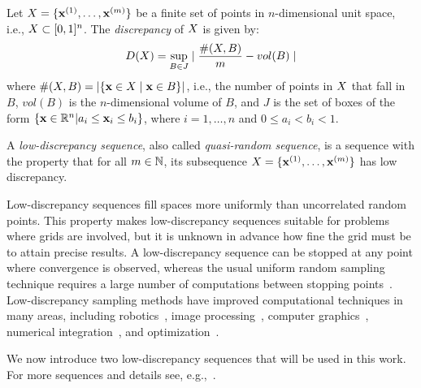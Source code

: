 \begin{definition}
	Let $X = \{  \mathbf{x}^{(1)}, \dots, \mathbf{x}^{(m)} \}$ be a finite set of points in
	$n$-dimensional unit space, i.e., $X \subset [0,1]^n$. The \emph{discrepancy}
	of $X$ is given by:
	\begin{equation}
		D(X) = \sup_{B \in J} \mid \frac{\#(X,B)}{m} - vol(B) \mid
	\end{equation}
	where $\#(X,B) = |\{ \mathbf{x} \in X \mid \mathbf{x} \in B \}|$, i.e., the number of
	points in $X$ that fall in $B$, $vol(B)$ is the $n$-dimensional volume of $B$,
	and $J$ is the set of boxes of the form $\{ \mathbf{x} \in \mathbb{R}^n | a_i \leq \mathbf{x}_i \leq b_i \}$,
	where $i=1,\dots,n$ and $0 \leq a_i < b_i < 1$.
\end{definition}

\begin{definition}
	A \emph{low-discrepancy sequence}, also called 
	\emph{quasi-random sequence}, is a sequence with the 
	property that for all $m \in \mathbb{N}$,
	its subsequence $X = \{ \mathbf{x}^{(1)}, \dots, \mathbf{x}^{(m)} \}$ has low discrepancy.
\end{definition}

Low-discrepancy sequences fill spaces more uniformly than uncorrelated
random points.
This property makes low-discrepancy sequences suitable for problems where grids are involved, but it is unknown in advance how fine the grid must be to attain precise results.
A low-discrepancy sequence can be stopped 
at any point where convergence is observed, whereas the usual uniform random sampling technique requires a large number of computations between stopping points~\cite{trandafir_quasirandom}. 
Low-discrepancy sampling methods have
improved computational techniques in many areas, including
robotics~\cite{branicky2001quasi}, image processing~\cite{hannaford1993resolution}, computer graphics~\cite{shirley1991discrepancy}, numerical integration~\cite{sloan1994lattice}, and optimization~\cite{niederreiter1992random}.

We now introduce two low-discrepancy sequences that will
be used in this work. For more sequences and details see, e.g.,~\cite{niederreiter1988low}.

